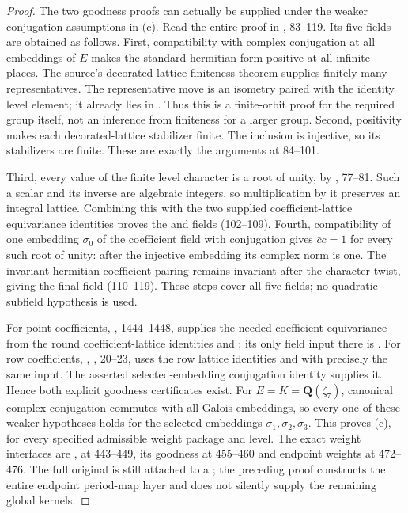 \documentclass[11pt,a4paper]{article}
\theoremstyle{definition}\newtheorem{remark}[theorem]{Remark}
\begin{document}
\begin{proof}
The two goodness proofs can actually be supplied under the weaker
conjugation assumptions in (c).
Read the entire proof  in
, 83--119.
Its five  fields are obtained as follows.
First, compatibility with complex conjugation at all embeddings of $E$
makes the standard hermitian form positive at all infinite places.
The source's decorated-lattice finiteness theorem supplies finitely many
representatives. The representative move is an isometry paired with the
identity level element; it already lies in .
Thus this is a finite-orbit proof for the required group itself, not an
inference from finiteness for a larger group.
Second, positivity makes each decorated-lattice stabilizer finite.
The inclusion  is injective, so its stabilizers are finite.
These are exactly the arguments at 84--101.

Third, every value of the finite level character is a root of unity,
by , 77--81.
Such a scalar and its inverse are algebraic integers, so multiplication
by it preserves an integral lattice.
Combining this with the two supplied coefficient-lattice equivariance
identities proves the  and  fields
(102--109).
Fourth, compatibility of one embedding $\sigma_0$ of the coefficient
field with conjugation gives $\bar c c=1$ for every such root of unity:
after the injective embedding its complex norm is one.
The invariant hermitian coefficient pairing remains invariant after
the character twist, giving the final  field (110--119).
These steps cover all five fields; no quadratic-subfield hypothesis is used.

For point coefficients, , 1444--1448, supplies the
needed coefficient equivariance from the round coefficient-lattice
identities and ; its only field input there is
.
For row coefficients,
, , 20--23,
uses the row lattice identities and  with precisely
the same input.
The asserted selected-embedding conjugation identity supplies it.
Hence both explicit goodness certificates exist.
For $E=K=\mathbf Q(\zeta_7)$, canonical complex conjugation commutes
with all Galois embeddings, so every one of these weaker hypotheses
holds for the selected embeddings $\sigma_1,\sigma_2,\sigma_3$.
This proves (c), for every specified admissible weight package and level.
The exact weight interfaces are ,
 at 443--449, its goodness at 455--460 and endpoint weights
at 472--476.
The full original  is still attached to a
; the preceding proof constructs the entire endpoint
period-map layer and does not silently supply the remaining global kernels.


\end{proof}
\end{document}
